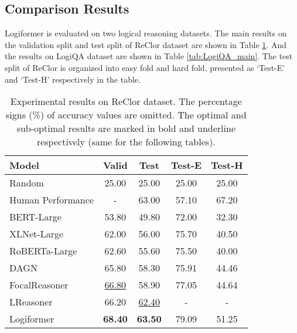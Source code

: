 \documentclass[sigconf]{acmart}
\begin{document}
\subsection{Comparison Results}
Logiformer is evaluated on two logical reasoning datasets. The main results on the validation split and test split of ReClor dataset are shown in Table \ref{tab:RECLOR_main}. And the results on LogiQA dataset are shown in Table \ref{tab:LogiQA_main}. The test split of ReClor is organized into easy fold and hard fold, presented as `Test-E' and `Test-H' respectively in the table.

\begin{table}[t]
	\centering
	\caption{Experimental results on ReClor dataset. The percentage signs (\%) of accuracy values are omitted. The optimal and sub-optimal results are marked in bold and underline respectively (same for the following tables).}
	\vspace{-0.2cm}
	\begin{tabular}{p{3.2cm}|cccc}
		\toprule
		\textbf{Model} &\textbf{Valid} &\textbf{Test} &\textbf{Test-E} &\textbf{Test-H}\\
		\hline
		Random &25.00 &25.00 &25.00 &25.00 \\
		Human Performance\cite{yu2019reclor}  &- &63.00 &57.10 &67.20 \\
		BERT-Large \cite{yu2019reclor} &53.80 &49.80 &72.00 &32.30 \\
		XLNet-Large\cite{yu2019reclor} &62.00 &56.00 &75.70 &40.50 \\
		RoBERTa-Large \cite{yu2019reclor}  &62.60 & 55.60 &75.50 &40.00 \\
		DAGN \cite{huang2021dagn} &65.80 & 58.30 &75.91 &44.46 \\
		FocalReasoner \cite{ouyang2021fact} & \underline{66.80} &58.90 &77.05 &44.64 \\
		LReasoner \cite{wang2021logic} & 66.20 & \underline{62.40} &- &-\\
		\hline
		Logiformer & \textbf{68.40} & \textbf{63.50} &79.09 &51.25\\
		\bottomrule
	\end{tabular}
	\label{tab:RECLOR_main}
	\vspace{-0.1cm}
\end{table}
\end{document}
